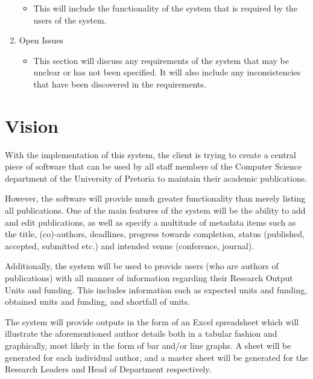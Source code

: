 \documentclass[a4paper,12pt]{article}
\begin{document}
\begin{enumerate}
\begin{itemize}
    \item This will include the functionality of the system that is required by the users of the system. 
\end{itemize}
    \item Open Issues
\begin{itemize}
    \item This section will discuss any requirements of the system that may be unclear or has not been specified. It will also include any inconsistencies that have been discovered in the requirements. 
\end{itemize}
\end{enumerate}

\newpage
\section{Vision}

With the implementation of this system, the client is trying to create a central piece of software that can be used by all staff members of the Computer Science department of the University of Pretoria to maintain their academic publications.

However, the software will provide much greater functionality than merely listing all publications. One of the main features of the system will be the ability to add and edit publications, as well as specify a multitude of metadata items such as the title, (co)-authors, deadlines, progress towards completion, status (published, accepted, submitted etc.) and intended venue (conference, journal).

Additionally, the system will be used to provide users (who are authors of publications) with all manner of information regarding their Research Output Units and funding. This includes information such as expected units and funding, obtained units and funding, and shortfall of units.

The system will provide outputs in the form of an Excel spreadsheet which will illustrate the aforementioned author details both in a tabular fashion and graphically, most likely in the form of bar and/or line graphs. A sheet will be generated for each individual author, and a master sheet will be generated for the Research Leaders and Head of Department respectively.
\end{document}
